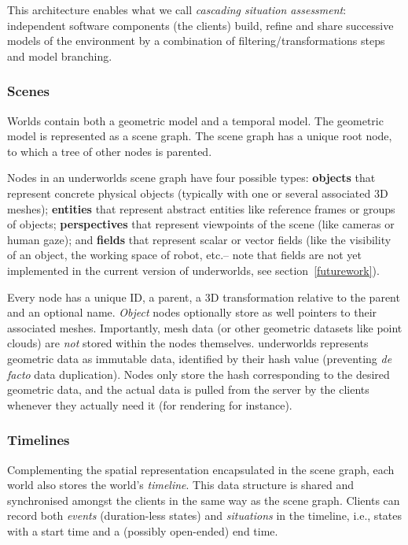\documentclass[conference]{IEEEtran}
\newcommand{\ie}{i.e.,\xspace}
\newcommand{\etc}{etc.\xspace}
\newcommand{\uwds}{{\sc underworlds}\xspace}
\begin{document}
This architecture enables what we call \emph{cascading situation assessment}:
independent software components (the clients) build, refine and share successive
models of the environment by a combination of filtering/transformations steps
and model branching.

\subsubsection{Scenes}

Worlds contain both a geometric model and a temporal model. The geometric
model is represented as a scene graph. The scene graph has a unique root node,
to which a tree of other nodes is parented.

Nodes in an \uwds scene graph have four possible types: \textbf{objects} that
represent concrete physical objects (typically with one or several associated 3D
meshes); \textbf{entities} that represent abstract entities like reference
frames or groups of objects; \textbf{perspectives} that represent viewpoints
of the scene (like cameras or human gaze); and \textbf{fields} that represent
scalar or vector fields (like the visibility of an object, the working space of
robot, \etc -- note that fields are not yet implemented in the current version
of \uwds, see section~\ref{futurework}).

Every node has a unique ID, a parent, a 3D transformation relative to the parent
and an optional name. \emph{Object} nodes optionally store as well pointers to
their associated meshes. Importantly, mesh data (or other geometric datasets
like point clouds) are \emph{not} stored within the nodes themselves. \uwds
represents geometric data as immutable data, identified by their hash value
(preventing \textit{de facto} data duplication).  Nodes only store the hash
corresponding to the desired geometric data, and the actual data is pulled from
the server by the clients whenever they actually need it (for rendering for
instance).

\subsubsection{Timelines}

Complementing the spatial representation encapsulated in the scene graph, each
world also stores the world's \emph{timeline}. This data structure is shared
and synchronised amongst the clients in the same way as the scene graph.
Clients can record both \emph{events} (duration-less states) and
\emph{situations} in the timeline, \ie states with a start time and a (possibly open-ended) end time.
\end{document}
